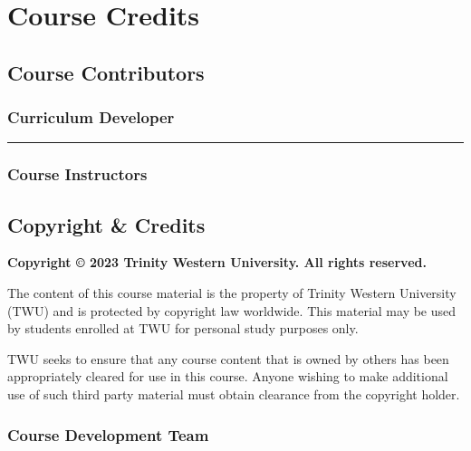 \documentclass[
]{book}
\begin{document}
\hypertarget{course-credits}{%
\chapter*{Course Credits}\label{course-credits}}

\hypertarget{course-contributors}{%
\section*{Course Contributors}\label{course-contributors}}

\hypertarget{curriculum-developer}{%
\subsection*{Curriculum Developer}\label{curriculum-developer}}

\begin{center}\rule{0.5\linewidth}{0.5pt}\end{center}

\hypertarget{course-instructors}{%
\subsection*{Course Instructors}\label{course-instructors}}

\hypertarget{copyright-credits}{%
\section*{Copyright \& Credits}\label{copyright-credits}}

\textbf{Copyright © 2023 Trinity Western University. All rights reserved.}

The content of this course material is the property of Trinity Western University (TWU) and is protected by copyright law worldwide. This material may be used by students enrolled at TWU for personal study purposes only.

TWU seeks to ensure that any course content that is owned by others has been appropriately cleared for use in this course. Anyone wishing to make additional use of such third party material must obtain clearance from the copyright holder.

\hypertarget{course-development-team}{%
\subsection{Course Development Team}\label{course-development-team}}
\end{document}
